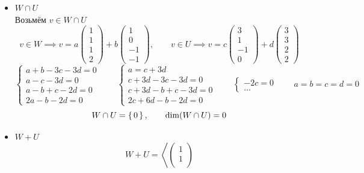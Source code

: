 \begin{itemize}
	\item $ W \cap U $ \\
    Возьмём $ v \in W \cap U $
    $$ v \in W \implies v = a
    \begin{pmatrix}
    	1 \\
        1 \\
        1 \\
        2
    \end{pmatrix} + b
    \begin{pmatrix}
    	1 \\
        0 \\
        -1 \\
        -1
    \end{pmatrix}, \qquad v \in U \implies v = c
    \begin{pmatrix}
    	3 \\
        1 \\
        -1 \\
        0
    \end{pmatrix} + d
    \begin{pmatrix}
    	3 \\
        3 \\
        2 \\
        2
    \end{pmatrix} $$
    $$
    \begin{cases}
    	a + b - 3c - 3d = 0 \\
        a - c - 3d = 0 \\
        a - b + c - 2d = 0 \\
        2a - b - 2d = 0
    \end{cases} \qquad
    \begin{cases}
    	a = c + 3d \\
        c + 3d - 3c - 3d = 0 \\
        c + 3d - b + c - 3d = 0 \\
        2c + 6d - b - 2d = 0
    \end{cases} \qquad
    \begin{cases}
    	-2c = 0 \\
        ...
    \end{cases} \qquad a = b = c = d = 0 $$
    $$ W \cap U = \set{0}, \qquad \dim(W \cap U) = 0 $$
    \item $ W + U $
    $$ W + U = \left\langle
    \begin{pmatrix}
    	1 \\
        1 \\

\end{pmatrix}$$
\end{itemize}
